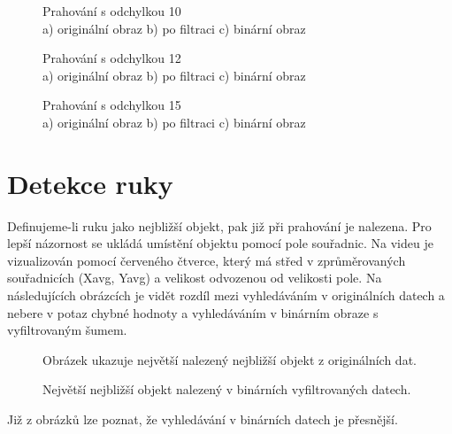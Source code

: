 \begin{figure}[htp]
\centering
{} \hfill
{} \hfill
{}
\caption{Prahování s odchylkou 10 \\ a) originální obraz b) po filtraci c) binární obraz}
\label{fig:tresh10}
\end{figure}
\begin{figure}[htp]
\centering
{} \hfill
{} \hfill
{}
\caption{Prahování s odchylkou 12 \\ a) originální obraz b) po filtraci c) binární obraz}
\label{fig:tresh11}
\end{figure}
\begin{figure}[htp]
\centering
{} \hfill
{} \hfill
{}
\caption{Prahování s odchylkou 15 \\ a) originální obraz b) po filtraci c) binární obraz}
\label{fig:tresh12}
\end{figure}
\section{Detekce ruky}
Definujeme-li ruku jako nejbližší objekt, pak již při prahování je nalezena. Pro lepší názornost se ukládá umístění objektu pomocí pole souřadnic. Na videu je vizualizován pomocí červeného čtverce, který má střed v zprůměrovaných souřadnicích (Xavg, Yavg) a velikost odvozenou od velikosti pole. 
Na následujících obrázcích je vidět rozdíl mezi vyhledáváním v originálních datech a nebere v potaz chybné hodnoty a vyhledáváním v binárním obraze s vyfiltrovaným šumem.
\begin{figure}[htp]
\centering
{}
\caption{Obrázek ukazuje největší nalezený nejbližší objekt z originálních dat.}
\label{fig:square_depth}
\end{figure}
\begin{figure}[htp]
\centering
{}
\caption{Největší nejbližší objekt nalezený v binárních vyfiltrovaných datech.}
\label{fig:square_bin}
\end{figure}

Již z obrázků lze poznat, že vyhledávání v binárních datech je přesnější.

